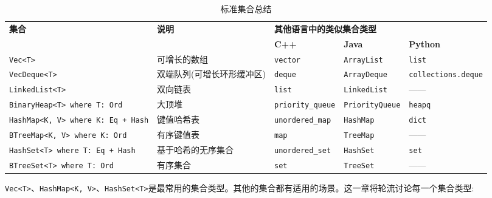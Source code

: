 \begin{table}[htb]
    \centering
    \caption{标准集合总结}
    \label{t16-1}
    \begin{tabular}{p{}p{}lll}
        \hline
        \multirow{2}{*}{\textbf{集合}}  & \multirow{2}{*}{\textbf{说明}} & \multicolumn{3}{l}{\textbf{其他语言中的类似集合类型}} \\
        \cline{3-5}
         & & \textbf{C++} & \textbf{Java} & \textbf{Python} \\
        \hline
        
        \texttt{Vec<T>} & 可增长的数组  & \texttt{vector} & \texttt{ArrayList} & \texttt{list}  \\
        \rowcolor{tablecolor}
        \texttt{VecDeque<T>} & 双端队列(可增长环形缓冲区) & \texttt{deque} & \texttt{ArrayDeque} & \texttt{collections.deque} \\
        \texttt{LinkedList<T>} & 双向链表 & \texttt{list} & \texttt{LinkedList} & —— \\
        \rowcolor{tablecolor}
        \texttt{BinaryHeap<T> where T: Ord} & 大顶堆 & \texttt{priority\_queue} & \texttt{PriorityQueue} & \texttt{heapq} \\
        \texttt{HashMap<K, V> where K: Eq + Hash} & 键值哈希表 & \texttt{unordered\_map} & \texttt{HashMap} & \texttt{dict} \\
        \rowcolor{tablecolor}
        \texttt{BTreeMap<K, V> where K: Ord} & 有序键值表 & \texttt{map} & \texttt{TreeMap} & —— \\
        \texttt{HashSet<T> where T: Eq + Hash} & 基于哈希的无序集合 & \texttt{unordered\_set} & \texttt{HashSet} & \texttt{set} \\
        \rowcolor{tablecolor}
        \texttt{BTreeSet<T> where T: Ord} & 有序集合 & \texttt{set} & \texttt{TreeSet} & —— \\
    \end{tabular}
\end{table}

\texttt{Vec<T>}、\texttt{HashMap<K, V>}、\texttt{HashSet<T>}是最常用的集合类型。其他的集合都有适用的场景。这一章将轮流讨论每一个集合类型:



